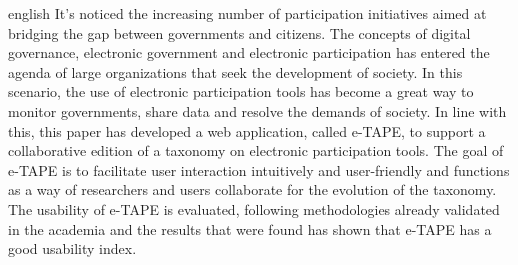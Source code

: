 \begin{resumo}[Abstract]
 \begin{otherlanguage*}{english}
It's noticed the increasing number of participation initiatives aimed at bridging the gap between governments and citizens.
The concepts of digital governance, electronic government and electronic participation has entered the agenda of large organizations that seek the development of society.
In this scenario, the use of electronic participation tools has become a great way to monitor governments, share data and resolve the demands of society.
In line with this, this paper has developed a web application, called e-TAPE, to support a collaborative edition of a taxonomy on electronic participation tools.
The goal of e-TAPE is to facilitate user interaction intuitively and user-friendly and functions as a way of researchers and users collaborate for the evolution of the taxonomy.
The usability of e-TAPE is evaluated, following methodologies already validated in the academia and the results that were found has shown that e-TAPE has a good usability index.
 \end{otherlanguage*}
\end{resumo}
\newpage